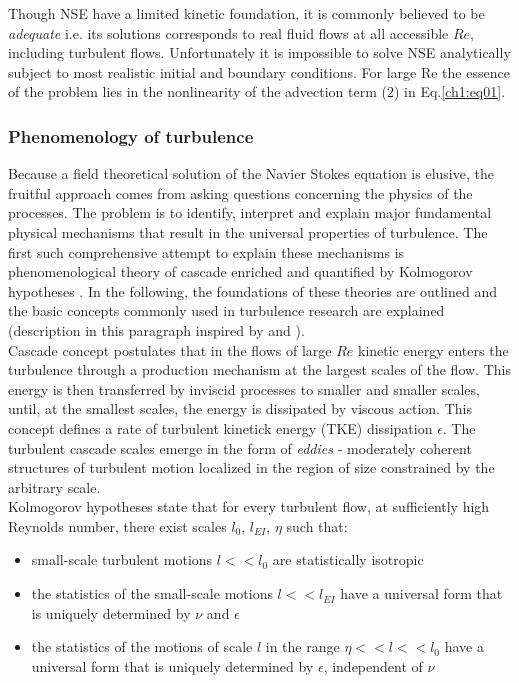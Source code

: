 \documentclass[../main.tex]{subfiles}
\begin{document}
\noindent Though NSE have a limited kinetic foundation, it is commonly believed to be \emph{adequate} i.e. its solutions corresponds to real fluid flows at all accessible $Re$, including turbulent flows. Unfortunately it is impossible to solve NSE analytically subject to most realistic initial and boundary conditions. For large Re the essence of the problem lies in the nonlinearity of the advection term (2) in Eq.\ref{ch1:eq01}.

\subsubsection{Phenomenology of turbulence}

Because a field theoretical solution of the Navier Stokes equation is elusive, the fruitful approach comes from asking questions concerning the physics of the processes. The problem is to identify, interpret and explain major fundamental physical mechanisms that result in the universal properties of turbulence. The first such comprehensive attempt to explain these mechanisms is phenomenological theory of cascade \citep{Richardson1922} enriched and quantified by Kolmogorov hypotheses \citep{Kolmogorov1941}. In the following, the foundations of these theories are outlined and the basic concepts commonly used in turbulence research are explained (description in this paragraph inspired by \citet{Pope2011} and \citet{Tsinober2001}).\\
Cascade concept postulates that in the flows of large $Re$ kinetic energy enters the turbulence through a production mechanism at the largest scales of the flow. This energy is then transferred by inviscid processes to smaller and smaller scales, until, at the smallest scales, the energy is dissipated by viscous action.  This concept defines a rate of turbulent kinetick energy (TKE) dissipation $\epsilon$.  The turbulent cascade scales emerge in the form of \emph{eddies} - moderately coherent structures of turbulent motion localized in the region of size constrained by the arbitrary scale.\\
Kolmogorov hypotheses state that for every turbulent flow, at sufficiently high Reynolds number, there exist scales $l_0$, $l_{EI}$, $\eta$ such that:
\begin{itemize}
\item small-scale turbulent motions $l<<l_0$ are statistically isotropic
\item the statistics of the small-scale motions $l<<l_{EI}$ have a universal form that is uniquely determined by $\nu$ and $\epsilon$
\item the statistics of the motions of scale $l$ in the range $\eta<<l<<l_0$ have a universal form that is uniquely determined by $\epsilon$, independent of $\nu$ 
\end{itemize}
\end{document}
